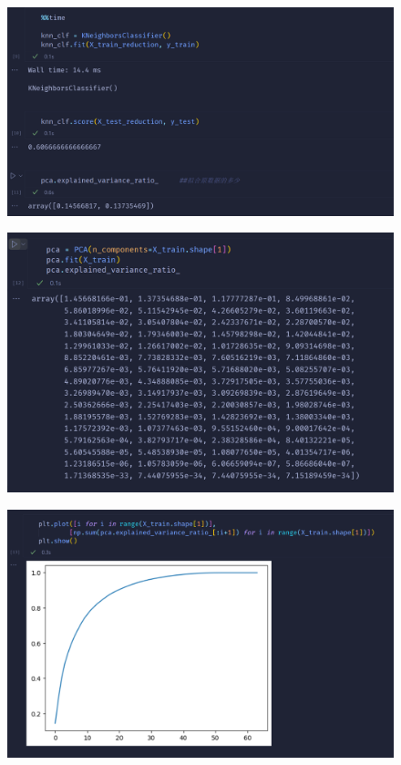 \documentclass{article}
\begin{document}
\begin{figure}[H]
    \centering
    \includegraphics[width=\linewidth]{9.png}
\end{figure}
\begin{figure}[H]
    \centering
    \includegraphics[width=\linewidth]{10.png}
\end{figure}
\begin{figure}[H]
    \centering
    \includegraphics[width=\linewidth]{11.png}
\end{figure}
\end{document}
